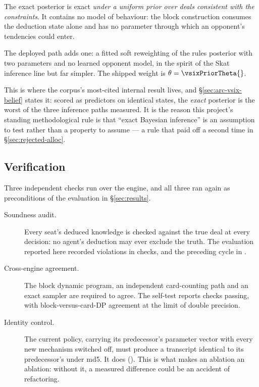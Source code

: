 The exact posterior is exact \emph{under a uniform prior over deals consistent with the
constraints}. It contains no model of behaviour: the block construction consumes the deduction state
alone and has no parameter through which an opponent's tendencies could enter.

The deployed path adds one: a fitted soft reweighting of the rules posterior with two parameters and
no learned opponent model, in the spirit of the Skat inference line
\cite{solinas-supervised,rebstock-inference,buro-kermit} but far simpler. The shipped weight is
$\theta = \vsixPriorTheta{}$.

This is where the corpus's most-cited internal result lives, and \S\ref{sec:arc-vsix-belief} states
it: scored as predictors on identical states, the \emph{exact} posterior is the worst of the three
inference paths measured. It is the reason this project's standing methodological rule is that
``exact Bayesian inference'' is an assumption to test rather than a property to assume --- a rule
that paid off a second time in \S\ref{sec:rejected-alloc}.

\subsection{Verification}
\label{sec:engine-verify}

Three independent checks run over the engine, and all three ran again as preconditions of the
evaluation in \S\ref{sec:results}.

\begin{description}
\item[Soundness audit.] Every seat's deduced knowledge is checked against the true deal at every
  decision: no agent's deduction may ever exclude the truth. The evaluation reported here recorded
  \vsevenVerifyViolations{} violations in \vsevenVerifyChecks{} checks, and the preceding cycle
  \vsixAuditViolations{} in \vsixAuditChecks{}.
\item[Cross-engine agreement.] The block dynamic program, an independent card-counting path and an
  exact sampler are required to agree. The self-test reports \vsevenSelftestChecks{} checks passing,
  with block-versus-card-DP agreement at the limit of double precision.
\item[Identity control.] The current policy, carrying its predecessor's parameter vector with every
  new mechanism switched off, must produce a transcript identical to its predecessor's under md5.
  It does (\vsixIdentity{}). This is what makes an ablation an ablation: without it, a measured
  difference could be an accident of refactoring.
\end{description}

